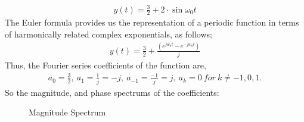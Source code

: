 \documentclass[10pt,a4paper, margin=1in]{article}
\begin{document}
\begin{enumerate}
\begin{enumerate}
\begin{align*}
        y(t) = \frac{3}{2} + 2\cdot \sin{\omega_0t}
    \end{align*}
    The Euler formula provides us the representation of a periodic function in terms of harmonically related complex exponentials, as follows;
    \begin{align*}
        y(t) = \frac{3}{2} + \frac{(e^{jw_0t} - e^{-jw_0t})}{j}
    \end{align*}
    Thus, the Fourier series coefficients of the function are,
    \begin{align*}
        a_0 = \frac{3}{2},\ a_1 = \frac{1}{j} = -j,\ a_{-1} = \frac{-1}{j} = j,\ a_k = 0 \ for \ k\neq -1,0,1.
    \end{align*}
    So the magnitude, and phase spectrums of the coefficients:
    \begin{figure} [h!]
        \centering
        \caption{Magnitude Spectrum}
        \label{fig:q2}
    \end{figure}
    

\end{enumerate}
\end{enumerate}
\end{document}
